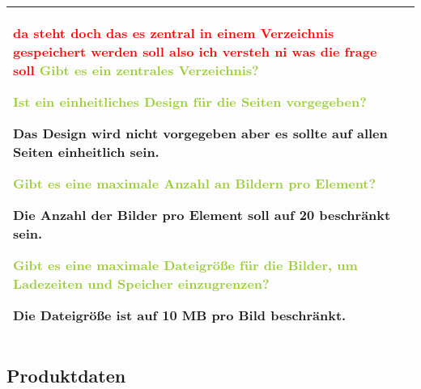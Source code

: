 \begin{tabular}[ht] {l | p{13cm}}
    \textcolor{Red}{da steht doch das es zentral in einem Verzeichnis gespeichert werden soll also ich versteh ni was die frage soll}
    \textcolor{YellowGreen}{Gibt es ein zentrales Verzeichnis?}

    \textcolor{NavyBlue}{}

    \textcolor{YellowGreen}{Ist ein einheitliches Design für die Seiten vorgegeben?}

    \textcolor{NavyBlue}{Das Design wird nicht vorgegeben aber es sollte auf allen Seiten einheitlich sein.}

    \textcolor{YellowGreen}{Gibt es eine maximale Anzahl an Bildern pro Element?}

    \textcolor{NavyBlue}{Die Anzahl der Bilder pro Element soll auf 20 beschränkt sein.}

    \textcolor{YellowGreen}{Gibt es eine maximale Dateigröße für die Bilder, um Ladezeiten und Speicher einzugrenzen?}

    \textcolor{NavyBlue}{Die Dateigröße ist auf 10 MB pro Bild beschränkt.}
    \\
    \hline
\end{tabular}

\subsection{Produktdaten}

